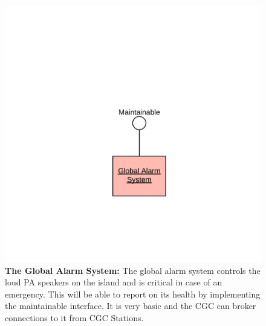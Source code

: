 \documentclass[12pt]{article}
\begin{document}
\begin{figure}[H]
    \centerline{\includegraphics[scale=.20]{GlobalAlarm.png}}
    \caption{\textbf{The Global Alarm System: }The global alarm system controls the loud PA speakers on the island and is critical
 in case of an emergency. This will be able to report on its health by implementing the maintainable 
 interface. It is very basic and the CGC can broker connections to it from CGC Stations.}
    \label{fig:GlobalAlarm}
\end{figure}  
\end{document}
